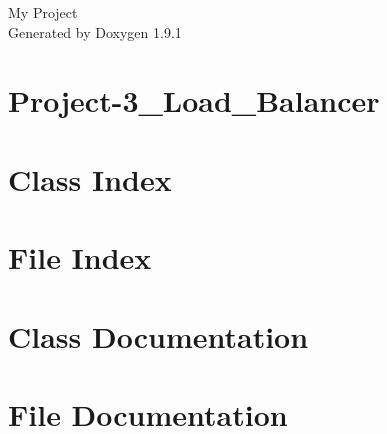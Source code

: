 \let\mypdfximage\pdfximage\def\pdfximage{\immediate\mypdfximage}\documentclass[twoside]{book}
\newcommand{\+}{\discretionary{\mbox{\scriptsize$\hookleftarrow$}}{}{}}
\newcommand{\clearemptydoublepage}{%
  \newpage{\pagestyle{empty}\cleardoublepage}%
}
\begin{document}
\raggedbottom

\hypersetup{pageanchor=false,
             bookmarksnumbered=true,
             pdfencoding=unicode
            }
\begin{titlepage}
\vspace*{7cm}
\begin{center}%
{\Large My Project }\\
\vspace*{1cm}
{\large Generated by Doxygen 1.9.1}\\
\end{center}
\end{titlepage}
\clearemptydoublepage
{}
\tableofcontents
\clearemptydoublepage
{}
\hypersetup{pageanchor=true}

\chapter{Project-\/3\+\_\+\+Load\+\_\+\+Balancer}
\label{md_src_README}

\chapter{Class Index}

\chapter{File Index}

\chapter{Class Documentation}








\chapter{File Documentation}



















\backmatter
\newpage
{}
\clearemptydoublepage
{}
\printindex
\end{document}
